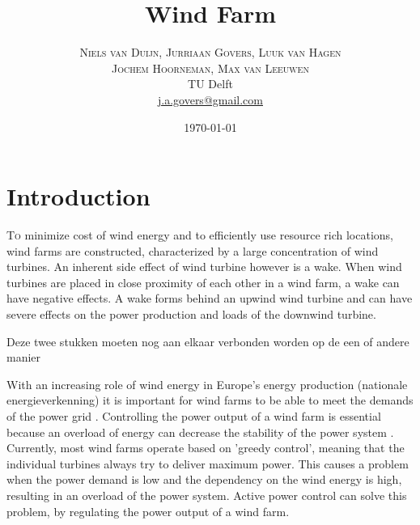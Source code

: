 \documentclass[twoside,twocolumn]{article}
\title{Wind Farm} %
\author{%
	\textsc{Niels van Duijn, Jurriaan Govers, Luuk van Hagen}\\
	\textsc{Jochem Hoorneman, Max van Leeuwen}\\%
	\normalsize TU Delft \\ %
	\normalsize \href{mailto:j.a.govers@gmail.com}{j.a.govers@gmail.com} %
}
\date{\today} %
\begin{document}
	
	\maketitle
	
	
	\section{Introduction}
	
	\lettrine[nindent=0em,lines=3]To minimize cost of wind energy and to efficiently use resource rich locations, wind farms are constructed, characterized by a large concentration of wind turbines. An inherent side effect of wind turbine however is a wake. When wind turbines are placed in close proximity of each other in a wind farm, a wake can have negative effects. A wake forms behind an upwind wind turbine and can have severe effects on the power production and loads of the downwind turbine. 

Deze twee stukken moeten nog aan elkaar verbonden worden op de een of andere manier

With an increasing role of wind energy in Europe's energy production (nationale energieverkenning) it is important for wind farms to be able to meet the demands of the power grid \cite{Tande2003}. Controlling the power output of a wind farm is essential because an overload of energy can decrease the stability of the power system \cite{Tande2003}. Currently, most wind farms operate based on 'greedy control', meaning that the individual turbines always try to deliver maximum power. This causes a problem when the power demand is low and the dependency on the wind energy is high, resulting in an overload of the power system. Active power control can solve this problem, by regulating the power output of a wind farm.
\end{document}
